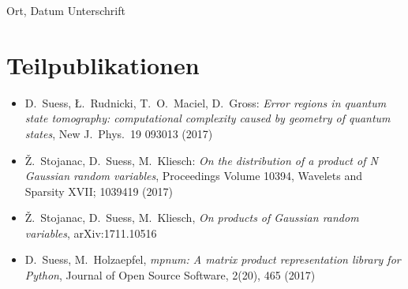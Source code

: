 \documentclass[
  a4paper,
  11pt,
  BCOR=8mm,
  twoside,
  headsepline]{scrbook}
\begin{document}
\vspace{4cm}

Ort, Datum \hfill Unterschrift \hspace{2cm}

\clearpage
\pagestyle{empty}
\section*{Teilpublikationen}
\begin{itemize}
  \item D.\ Suess, Ł.\ Rudnicki, T.\ O.\ Maciel, D.\ Gross: \textit{Error regions in quantum state tomography: computational complexity caused by geometry of quantum states}, New J.\ Phys.\ 19 093013 (2017)
  \item Ž.\ Stojanac, D.\ Suess, M.\ Kliesch: \textit{On the distribution of a product of N Gaussian random variables}, Proceedings Volume 10394, Wavelets and Sparsity XVII; 1039419 (2017)
  \item Ž.\ Stojanac, D.\ Suess, M.\ Kliesch, \textit{On products of Gaussian random variables}, arXiv:1711.10516
  \item D.\ Suess, M.\ Holzaepfel, \textit{mpnum: A matrix product representation library for Python}, Journal of Open Source Software, 2(20), 465 (2017)
\end{itemize}
\end{document}
